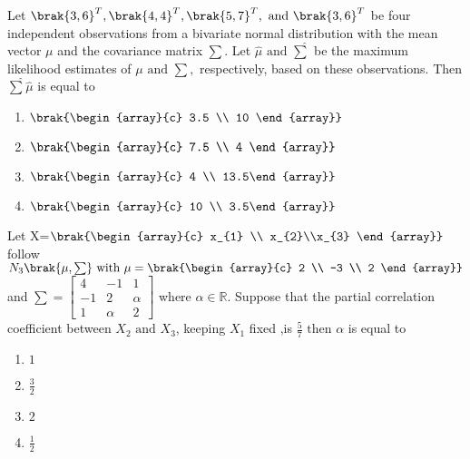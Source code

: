 \bigskip
\item Let $\brak{3,6}^{T},\brak{4,4}^{T},\brak{5,7}^{T},\text{ and }\brak{3,6}^{T}$ be four independent observations from a
bivariate normal distribution with the mean vector $\mu$ and the covariance matrix $\sum.$ Let $\hat{\mu} \text{ and } \hat{\sum}$ be the maximum likelihood estimates of $\mu \text{ and } \sum,$ respectively, based on
these observations. Then $\hat{\sum}\hat{\mu}$ is equal to
\begin{enumerate}
    \item $\brak{\begin{array}{c} 3.5 \\ 10 \end{array}}$
    \item $\brak{\begin{array}{c} 7.5 \\ 4 \end{array}}$
    \item $\brak{\begin{array}{c} 4 \\ 13.5\end{array}}$
    \item $\brak{\begin{array}{c} 10 \\ 3.5\end{array}}$
\end{enumerate}
\bigskip
\item Let X=$\brak{\begin{array}{c} x_{1} \\ x_{2}\\x_{3} \end{array}}$  follow $N_{3}\brak{\mu,\sum}\text{ with }\mu=\brak{\begin{array}{c} 2 \\ -3 \\ 2 \end{array}}$
and $\sum=\begin{bmatrix} 
4 & -1 & 1 \\ 
-1 & 2 & \alpha \\ 
1 &  \alpha & 2 
\end{bmatrix}$ where $ \alpha\in\mathbb{R}.$ Suppose that the partial correlation coefficient between $X_{2}\text{ and } X_{3}$, keeping $X_{1}$ fixed ,is $\frac{5}{7} \text{ then }\alpha$ is equal to
\begin{enumerate}
    \item $1$
    \item $\frac{3}{2}$
    \item $2$
    \item $\frac{1}{2}$
\end{enumerate}
 

